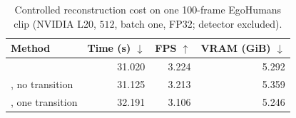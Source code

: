 \begin{table}[t]
  \centering
  \caption{Controlled reconstruction cost on one 100-frame EgoHumans clip
  (NVIDIA L20, $512$, batch one, FP32; detector excluded).}
  \label{tab:runtime-main}
  \small
  \setlength{\tabcolsep}{5pt}
  \begin{tabular}{lrrr}
    \toprule
    Method & Time (s) $\downarrow$ & FPS $\uparrow$ & VRAM (GiB) $\downarrow$ \\
    \midrule
    \humanthree{} & 31.020 & 3.224 & 5.292 \\
    \method{}, no transition & 31.125 & 3.213 & 5.359 \\
    \method{}, one transition & 32.191 & 3.106 & 5.246 \\
    \bottomrule
  \end{tabular}
\end{table}
